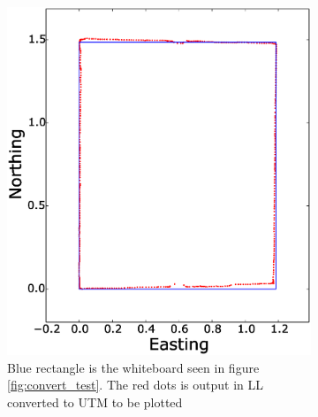 \begin{figure}[H]
    \centering
    \begin{subfigure}[b]{0.45\textwidth}
        \includegraphics[width=\textwidth]{graphics/coordincate_conversion_test.eps}
        \caption{Blue 
rectangle is the whiteboard seen in figure \ref{fig:convert_test}. The red dots is output in \ac{LL} converted to UTM to be plotted}
        \label{fig:coordinate_test_polot}
    \end{subfigure}
    ~ %
    \begin{subfigure}[b]{0.45\textwidth}

\end{subfigure}
\end{figure}
